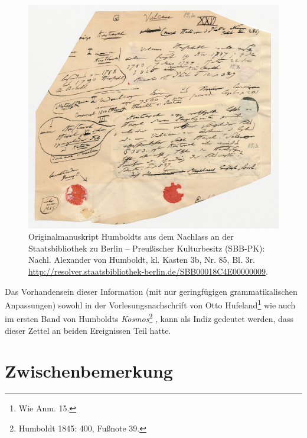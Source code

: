 \begin{figure}[htbp]
\centering
\includegraphics[width=\textwidth]{figures/hug01.jpg}
\caption{Originalmanuskript Humboldts aus dem Nachlass an der
Staatsbibliothek zu Berlin -- Preußischer Kulturbesitz (SBB-PK): Nachl.
Alexander von Humboldt, kl. Kasten 3b, Nr. 85, Bl. 3r.
\url{http://resolver.staatsbibliothek-berlin.de/SBB00018C4E00000009}.}
\end{figure}

Das Vorhandensein dieser Information (mit nur geringfügigen
grammatikalischen Anpassungen) sowohl in der Vorlesungsnachschrift von
Otto Hufeland\footnote{Wie Anm. 15.} wie auch im ersten Band von
Humboldts \emph{Kosmos}\footnote{Humboldt 1845: 400, Fußnote 39.} , kann
als Indiz gedeutet werden, dass dieser Zettel an beiden Ereignissen Teil
hatte.

\section*{Zwischenbemerkung}\label{zwischenbemerkung}

